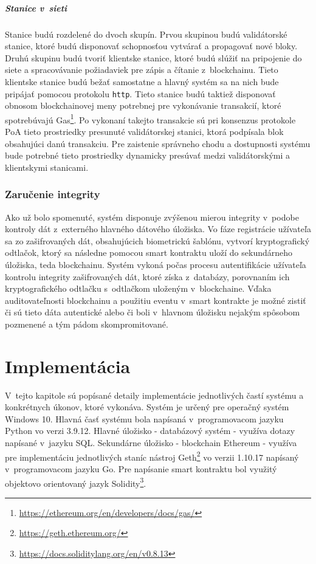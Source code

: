 \paragraph{Stanice v~sieti}
Stanice budú rozdelené do dvoch skupín. Prvou skupinou budú validátorské stanice, ktoré budú disponovať schopnosťou vytvárať a propagovať nové bloky. Druhú skupinu budú tvoriť klientske stanice, ktoré budú slúžiť na pripojenie do siete a spracovávanie požiadaviek pre zápis a čítanie z~blockchainu. Tieto klientske stanice budú bežať samostatne a hlavný systém sa na nich bude pripájať pomocou protokolu \texttt{http}. Tieto stanice budú taktiež disponovať obnosom blockchainovej meny potrebnej pre vykonávanie transakcií, ktoré spotrebúvajú Gas\footnote{\url{https://ethereum.org/en/developers/docs/gas/}}. Po vykonaní takejto transakcie sú pri konsenzus protokole PoA tieto prostriedky presunuté validátorskej stanici, ktorá podpísala blok obsahujúci danú transakciu. Pre zaistenie správneho chodu a dostupnosti systému bude potrebné tieto prostriedky dynamicky presúvať medzi validátorskými a klientskymi stanicami.

\subsection{Zaručenie integrity}
Ako už bolo spomenuté, systém disponuje zvýšenou mierou integrity v~podobe kontroly dát z~externého hlavného dátového úložiska. Vo fáze registrácie užívateľa sa zo zašifrovaných dát, obsahujúcich biometrickú šablónu, vytvorí kryptografický odtlačok, ktorý sa následne pomocou smart kontraktu uloží do sekundárneho úložiska, teda blockchainu. Systém vykoná počas procesu autentifikácie užívateľa kontrolu integrity zašifrovaných dát, ktoré získa z~databázy, porovnaním ich kryptografického odtlačku s~odtlačkom uloženým v~blockchaine. Vďaka auditovateľnosti blockchainu a použitiu eventu v~smart kontrakte je možné zistiť či sú tieto dáta autentické alebo či boli v~hlavnom úložisku nejakým spôsobom pozmenené a tým pádom skompromitované.


\chapter{Implementácia}
V~tejto kapitole sú popísané detaily implementácie jednotlivých častí systému a konkrétnych úkonov, ktoré vykonáva. Systém je určený pre operačný systém Windows 10. Hlavná časť systému bola napísaná v~programovacom jazyku Python vo verzi 3.9.12. Hlavné úložisko - databázový systém - využíva dotazy napísané v~jazyku SQL. Sekundárne úložisko - blockchain Ethereum - využíva pre implementáciu jednotlivých staníc nástroj Geth\footnote{\url{https://geth.ethereum.org/}} vo verzii 1.10.17 napísaný v~programovacom jazyku Go. Pre napísanie smart kontraktu bol využitý objektovo orientovaný jazyk Solidity\footnote{\url{https://docs.soliditylang.org/en/v0.8.13}}.

